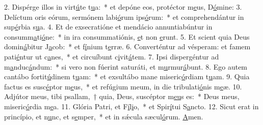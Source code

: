 2. Dispérge illos in virt\uline{ú}te t\uline{u}a:~* et depóne eos, protéctor m\uline{e}us, D\uline{ó}mine:
3. Delíctum oris eórum, sermónem labi\uline{ó}rum ips\uline{ó}rum:~* et comprehendántur in sup\uline{é}rbia s\uline{u}a.
4. Et de exsecratióne et mendácio annuntiabúntur in consumm\uline{a}ti\uline{ó}ne:~* in ira consummatiónis, \uline{e}t non \uline{e}runt.
5. Et scient quia Deus domin\uline{á}bitur J\uline{a}cob:~* et f\uline{í}nium t\uline{e}rræ.
6. Converténtur ad vésperam: et famem pati\uline{é}ntur ut c\uline{a}nes,~* et circuíbunt c\uline{i}vit\uline{á}tem.
7. Ipsi dispergéntur ad m\uline{a}nduc\uline{á}ndum:~* si vero non fúerint saturáti, et m\uline{u}rmur\uline{á}bunt.
8. Ego autem cantábo fortit\uline{ú}dinem t\uline{u}am:~* et exsultábo mane miseric\uline{ó}rdiam t\uline{u}am.
9. Quia factus es susc\uline{é}ptor m\uline{e}us,~* et refúgium meum, in die tribulati\uline{ó}nis m\uline{e}æ.
10. Adjútor meus, tibi psallam,~† quia, Deus, suscéptor m\uline{e}\uline{u}s es:~* Deus meus, miseric\uline{ó}rdia m\uline{e}a.
11. Glória Patri, et F\uline{í}l\uline{i}o,~* et Spir\uline{í}tui S\uline{a}ncto.
12. Sicut erat in princípio, et n\uline{u}nc, et s\uline{e}mper,~* et in sǽcula sæcul\uline{ó}rum. \uline{A}men.
